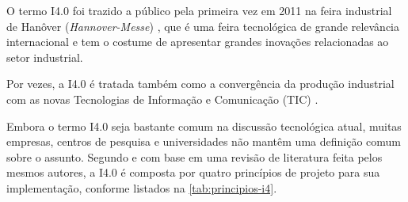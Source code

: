 O termo I4.0 foi trazido a público pela primeira vez em 2011 na feira industrial de Hanôver (\textit{Hannover-Messe}) \cite{kagermann2011industrie}, que é uma feira tecnológica de grande relevância internacional e tem o costume de apresentar grandes inovações relacionadas ao setor industrial.

Por vezes, a I4.0 é tratada também como a convergência da produção industrial com as novas Tecnologias de Informação e Comunicação (TIC) \cite{hermann2016design}.

Embora o termo I4.0 seja bastante comum na discussão tecnológica atual, muitas empresas, centros de pesquisa e universidades não mantêm uma definição comum sobre o assunto. Segundo  e com base em uma revisão de literatura feita pelos mesmos autores, a I4.0 é composta por quatro princípios de projeto para sua implementação, conforme listados na \autoref{tab:principios-i4}.

